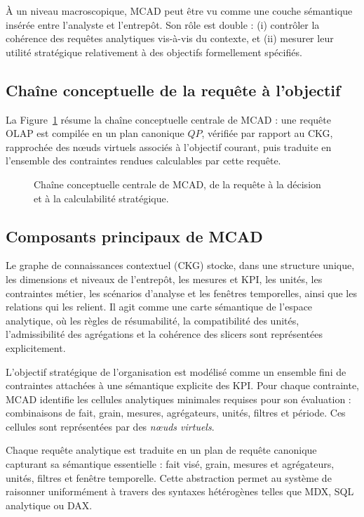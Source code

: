 \documentclass[journal]{IEEEtran}
\begin{document}
À un niveau macroscopique, MCAD peut être vu comme une couche sémantique insérée entre l'analyste et l'entrepôt. Son rôle est double : (i) contrôler la cohérence des requêtes analytiques vis-à-vis du contexte, et (ii) mesurer leur utilité stratégique relativement à des objectifs formellement spécifiés.

\subsection{Chaîne conceptuelle de la requête à l'objectif}

La Figure~\ref{fig:concept-chain} résume la chaîne conceptuelle centrale de MCAD : une requête OLAP est compilée en un plan canonique $QP$, vérifiée par rapport au CKG, rapprochée des nœuds virtuels associés à l'objectif courant, puis traduite en l'ensemble des contraintes rendues calculables par cette requête.

\begin{figure}[!t]
\centering
\resizebox{\textwidth}{!}{}
\caption{Chaîne conceptuelle centrale de MCAD, de la requête à la décision et à la calculabilité stratégique.}
\label{fig:concept-chain}
\end{figure}

\subsection{Composants principaux de MCAD}

Le graphe de connaissances contextuel (CKG) stocke, dans une structure unique, les dimensions et niveaux de l'entrepôt, les mesures et KPI, les unités, les contraintes métier, les scénarios d'analyse et les fenêtres temporelles, ainsi que les relations qui les relient. Il agit comme une carte sémantique de l'espace analytique, où les règles de résumabilité, la compatibilité des unités, l'admissibilité des agrégations et la cohérence des slicers sont représentées explicitement.

L'objectif stratégique de l'organisation est modélisé comme un ensemble fini de contraintes attachées à une sémantique explicite des KPI. Pour chaque contrainte, MCAD identifie les cellules analytiques minimales requises pour son évaluation : combinaisons de fait, grain, mesures, agrégateurs, unités, filtres et période. Ces cellules sont représentées par des \emph{nœuds virtuels}.

Chaque requête analytique est traduite en un plan de requête canonique capturant sa sémantique essentielle : fait visé, grain, mesures et agrégateurs, unités, filtres et fenêtre temporelle. Cette abstraction permet au système de raisonner uniformément à travers des syntaxes hétérogènes telles que MDX, SQL analytique ou DAX.
\end{document}
